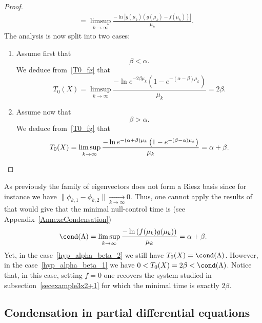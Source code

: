 \begin{proof}
\begin{equation}
\begin{aligned}
&= \limsup_{k \to \infty} \frac{ -\ln \left| g(\mu_k) (g(\mu_k) - f(\mu_k)) \right| }{\mu_k}.
\end{aligned}
\end{equation}
The analysis is now split into two cases:
\begin{enumerate}
\item \label{list-pr-prop5.7.1}Assume first that
\begin{equation}\label{hyp_alpha_beta_1}
\beta < \alpha.
\end{equation}
We deduce from~\eqref{T0_fg} that
\[
T_0(X) = \limsup_{k \to \infty} \frac{ -\ln e^{-2\beta \mu_k} \left(1- e^{-(\alpha-\beta) \mu_k} \right) }{\mu_k} = 2 \beta.
\]
\item \label{list-pr-prop5.7.2}Assume now that
\begin{equation}\label{hyp_alpha_beta_2}
\beta > \alpha.
\end{equation}
We deduce from~\eqref{T0_fg} that
\[
T_0(X) = \limsup_{k \to \infty} \frac{ -\ln e^{-(\alpha+\beta) \mu_k} \left(1- e^{-(\beta-\alpha) \mu_k} \right) }{\mu_k} = \alpha + \beta.\qedhere
\]
\end{enumerate}
\end{proof}



\begin{rema}
As previously the family of eigenvectors does not form a Riesz basis since for instance we have $\| \phi_{k,1} - \phi_{k,2} \| \underset{k \to \infty}{\longrightarrow} 0$. Thus, one cannot apply the results of~\cite{AmmarKhodjaBenabdallahGonzalez-BurgosdeTeresa:2014} that would give that the minimal null-control time is (see Appendix~\ref{AnnexeCondensation})
\[
\cond(\Lambda)=\limsup_{k \to \infty} \frac{-\ln \left(f(\mu_k)g(\mu_k)\right)}{\mu_k} = \alpha + \beta.
\]
Yet, in the case~\eqref{hyp_alpha_beta_2} we still have $T_0(X)=\cond(\Lambda)$. However, in the case~\eqref{hyp_alpha_beta_1} we have $0<T_0(X) = 2 \beta < \cond(\Lambda)$. Notice that, in this case, setting $f=0$ one recovers the system studied in subsection~\ref{secexample3x2+1} for which the minimal time is exactly $2\beta$.
\end{rema}



\subsection{Condensation in partial differential equations} \label{Subsec:ExemplesEDP}

